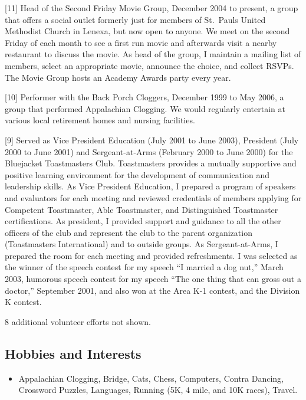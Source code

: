 \documentclass[
  12pt,
]{article}
\providecommand{\tightlist}{%
  \setlength{\itemsep}{0pt}\setlength{\parskip}{0pt}}
\begin{document}
{[}11{]} Head of the Second Friday Movie Group, December 2004 to
present, a group that offers a social outlet formerly just for members
of St.~Pauls United Methodist Church in Lenexa, but now open to anyone.
We meet on the second Friday of each month to see a first run movie and
afterwards visit a nearby restaurant to discuss the movie. As head of
the group, I maintain a mailing list of members, select an appropriate
movie, announce the choice, and collect RSVPs. The Movie Group hosts an
Academy Awards party every year.

{[}10{]} Performer with the Back Porch Cloggers, December 1999 to May
2006, a group that performed Appalachian Clogging. We would regularly
entertain at various local retirement homes and nursing facilities.

{[}9{]} Served as Vice President Education (July 2001 to June 2003),
President (July 2000 to June 2001) and Sergeant-at-Arms (February 2000
to June 2000) for the Bluejacket Toastmasters Club. Toastmasters
provides a mutually supportive and positive learning environment for the
development of communication and leadership skills. As Vice President
Education, I prepared a program of speakers and evaluators for each
meeting and reviewed credentials of members applying for Competent
Toastmaster, Able Toastmaster, and Distinguished Toastmaster
certifications. As president, I provided support and guidance to all the
other officers of the club and represent the club to the parent
organization (Toastmasters International) and to outside groups. As
Sergeant-at-Arms, I prepared the room for each meeting and provided
refreshments. I was selected as the winner of the speech contest for my
speech ``I married a dog nut,'' March 2003, humorous speech contest for
my speech ``The one thing that can gross out a doctor,'' September 2001,
and also won at the Area K-1 contest, and the Division K contest.

8 additional volunteer efforts not shown.

\subsection{Hobbies and Interests}\label{hobbies-and-interests}

\begin{itemize}
\tightlist
\item
  Appalachian Clogging, Bridge, Cats, Chess, Computers, Contra Dancing,
  Crossword Puzzles, Languages, Running (5K, 4 mile, and 10K races),
  Travel.
\end{itemize}
\end{document}
